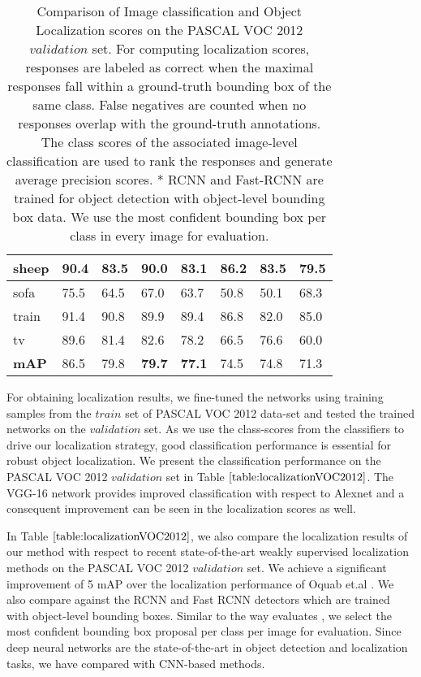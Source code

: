 \documentclass[runningheads]{llncs}
\begin{document}
\begin{table}[]
\begin{tabular}{|L|L|L|L|L|L|L|L|}
sheep & 90.4 & 83.5 & 90.0 & 83.1 & 86.2 & 83.5 & 79.5 \\ \hline
sofa & 75.5 & 64.5 & 67.0 & 63.7 & 50.8 & 50.1 & 68.3 \\ \hline
train & 91.4 & 90.8 & 89.9 & 89.4 & 86.8 & 82.0 & 85.0 \\ \hline
tv & 89.6 & 81.4 & 82.6 & 78.2 & 66.5 & 76.6 & 60.0 \\ \hline
\textbf{mAP} & 86.5 & 79.8 & \textbf{79.7} & \textbf{77.1} & 74.5 & 74.8 & 71.3 \\ \hline
\end{tabular}
\caption{Comparison of Image classification and Object Localization scores on the PASCAL VOC 2012 $\textit{validation}$ set. For computing localization scores, responses are labeled as correct when the maximal responses fall within a ground-truth bounding box of the same class. False negatives are counted when no responses overlap with the ground-truth annotations. The class scores of the associated image-level classification are used to rank the responses and generate average precision scores. * RCNN and Fast-RCNN are trained for object detection with object-level bounding box data. We use the most confident bounding box per class in every image for evaluation.}
\label{table:localizationVOC2012}

\end{table}


 For obtaining localization results, we fine-tuned the networks using training samples from the $\textit{train}$ set of PASCAL VOC 2012 data-set and tested the trained networks on the $\textit{validation}$ set. As we use the class-scores from the classifiers to drive our localization strategy, good classification performance is essential for robust object localization. We present the classification performance on the PASCAL VOC 2012 $\textit{validation}$ set in Table $\ref{table:localizationVOC2012}$. The VGG-16 network provides improved classification with respect to Alexnet and a consequent improvement can be seen in the localization scores as well.

In Table $\ref{table:localizationVOC2012}$, we also compare the localization results of our method with respect to recent state-of-the-art weakly supervised localization methods on the PASCAL VOC 2012 $\textit{validation}$ set. We achieve a significant improvement of 5 mAP over the  localization performance of Oquab et.al \cite{oquabobject}. We also compare against the RCNN \cite{girshick2014rich} and Fast RCNN \cite{girshickICCV15fastrcnn} detectors which are trained with object-level bounding boxes. Similar to the way \cite{oquabobject} evaluates \cite{girshick2014rich}, we select the most confident bounding box proposal per class per image for evaluation. Since deep neural networks are the state-of-the-art in object detection and localization tasks, we have compared with CNN-based methods.
\end{document}
